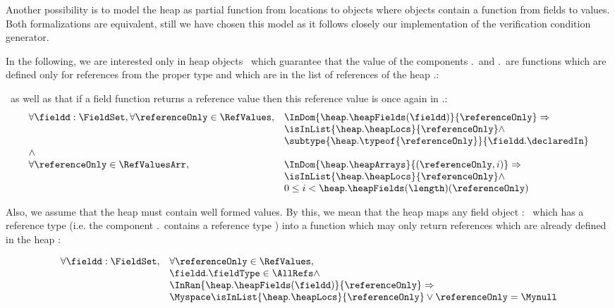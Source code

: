  Another possibility is to model the heap as partial function from locations to objects where objects contain a function from 
 fields to values. Both formalizations are equivalent, still we have chosen this model as it follows closely our implementation
 of the verification condition generator.

 In the following, we are interested only in  heap objects \heap \ which guarantee that the value of the components
 \heap.\heapFields \ and \heap.\heapArrays \ are functions which are defined only for references from the proper
 type and which are in the list of references of the heap \heap.\heapLocs: 

 \ as well as that if a field function
 returns a reference value then this reference value is once again in \heap.\heapLocs :
 $$\begin{array}{ll}
          \forall  \fieldd : \FieldSet, \forall \referenceOnly \in \RefValues, &  \InDom{ \heap.\heapFields(\fieldd)}{\referenceOnly } \Rightarrow \\
	  & \isInList{ \heap.\heapLocs  }{\referenceOnly} \wedge \\
	  & \subtype{ \heap.\typeof{\referenceOnly }}{\fieldd.\declaredIn} \\
	  \wedge &  \\
	  \forall \referenceOnly \in  \RefValuesArr, &  \InDom{ \heap.\heapArrays}{(\referenceOnly  , i )} \Rightarrow \\
	  & \isInList{\heap.\heapLocs}{  \referenceOnly }\wedge \\
	  & 0 \leq i < \heap.\heapFields( \length)( \referenceOnly)  
	 
   \end{array}
  $$

Also, we assume that the heap must contain well formed values. By this, we mean that the heap    maps any field object
 \fieldd : \FieldSet \ which has a reference  type (i.e. the component \fieldd.\fieldType \ contains a reference type  )  
into a function which may only return references which are already defined in the heap : 

 $$\begin{array}{ll}
          \forall  \fieldd : \FieldSet, & \forall \referenceOnly \in \RefValues, \\ 
          & \fieldd.\fieldType \in \AllRefs  \wedge \\
	  & \InRan{ \heap.\heapFields(\fieldd)}{\referenceOnly } \Rightarrow \\
	  & \Myspace \isInList{ \heap.\heapLocs  }{\referenceOnly} \vee \referenceOnly = \Mynull \\	  
   \end{array}
  $$
 
